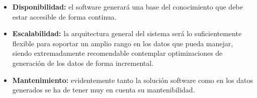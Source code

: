\begin{itemize}
  \item \textbf{Disponibilidad:} el software generará una base del 
	conocimiento que debe estar accesible de forma continua.
  \item \textbf{Escalabilidad:} la arquitectura general del sistema 
	será lo suficientemente flexible para soportar un amplio
	rango en los datos que pueda manejar, siendo extremadamente
	recomendable contemplar optimizaciones de generación de los 
	datos de forma incremental.
  \item \textbf{Mantenimiento:} evidentemente tanto la solución software 
	como en los datos generados se ha de tener muy en cuenta su
	mantenibilidad.
\end{itemize}




